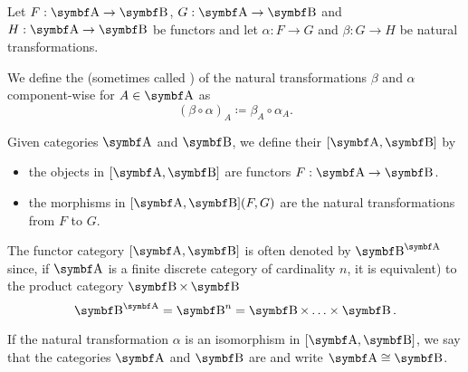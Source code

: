 \begin{definition}\label{def:natural_transformation_composition}
  Let \( F: \Bold A \to \Bold B \), \( G: \Bold A \to \Bold B \) and \( H: \Bold A \to \Bold B \) be functors and let \( \alpha: F \to G \) and \( \beta: G \to H \) be natural transformations.

  We define the  (sometimes called ) of the natural transformations \( \beta \) and \( \alpha \) component-wise for \( A \in \Bold A \) as
  \begin{equation*}
    (\beta \circ \alpha)_A \coloneqq \beta_{A} \circ \alpha_A.
  \end{equation*}
\end{definition}

\begin{definition}\label{def:functor_category}
  Given categories \( \Bold A \) and \( \Bold B \), we define their  \( [\Bold A, \Bold B] \) by
  \begin{itemize}
    \item the objects in \( [\Bold A, \Bold B] \) are functors \( F: \Bold A \to \Bold B \).
    \item the morphisms in \( [\Bold A, \Bold B](F, G) \) are the natural transformations from \( F \) to \( G \).
  \end{itemize}

  The functor category \( [\Bold A, \Bold B] \) is often denoted by \( {\Bold B}^{\Bold A} \) since, if \( \Bold A \) is a finite discrete category of cardinality \( n \), it is equivalent) to the product category \( \Bold B \times \Bold B \)
  \begin{equation*}
    {\Bold B}^{\Bold A} = {\Bold B}^n = \Bold B \times \ldots \times \Bold B.
  \end{equation*}

  If the natural transformation \( \alpha \) is an isomorphism in \( [\Bold A, \Bold B] \), we say that the categories \( \Bold A \) and \( \Bold B \) are  and write \( \Bold A \cong \Bold B \).
\end{definition}


